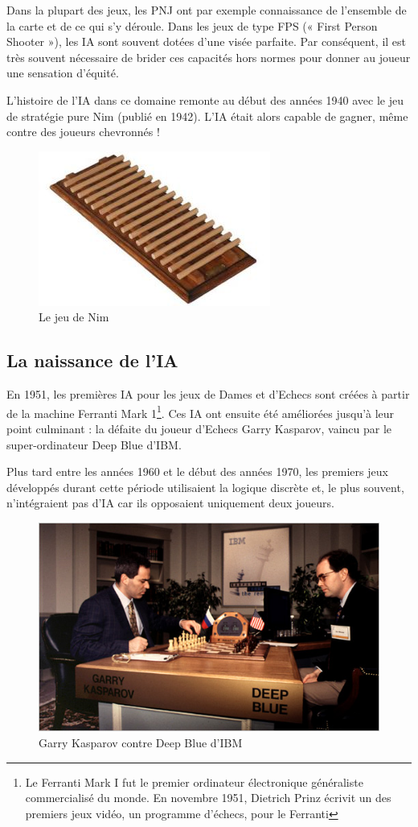 \documentclass[a4paper, 12pt]{article} %
\begin{document}
Dans la plupart des jeux, les PNJ ont par exemple connaissance de l’ensemble de la carte et de ce qui s’y déroule. Dans les jeux de type FPS (« First Person Shooter »), les IA sont souvent dotées d’une visée parfaite. Par conséquent, il est très souvent nécessaire de brider ces capacités hors normes pour donner au joueur une sensation d’équité. 

L’histoire de l’IA dans ce domaine remonte au début des années 1940 avec le jeu de stratégie pure Nim (publié en 1942). L’IA était alors capable de gagner, même contre des joueurs chevronnés !

\begin{figure}[!h]%
	\begin{center} 
		\includegraphics[width=0.60\columnwidth]{images/nim.png}%
		\caption{Le jeu de Nim}%
	\end{center}
\end{figure}

\newpage
\subsection{La naissance de l’IA}
En 1951, les premières IA pour les jeux de Dames et d’Echecs sont créées à partir de la machine Ferranti Mark 1\footnote{Le Ferranti Mark I fut le premier ordinateur électronique généraliste commercialisé du monde. En novembre 1951, Dietrich Prinz écrivit un des premiers jeux vidéo, un programme d’échecs, pour le Ferranti}. Ces IA ont ensuite été améliorées jusqu’à leur point culminant : la défaite du joueur d’Echecs Garry Kasparov, vaincu par le super-ordinateur Deep Blue d’IBM. 

Plus tard entre les années 1960 et le début des années 1970, les premiers jeux développés durant cette période utilisaient la logique discrète et, le plus souvent, n’intégraient pas d’IA car ils opposaient uniquement deux joueurs. 

\begin{figure}[!h]%
	\begin{center} 
		\includegraphics[width=0.60\columnwidth]{images/DeepBlue.png}%
		\caption{Garry Kasparov contre Deep Blue d'IBM}%
	\end{center}
\end{figure}
\end{document}
